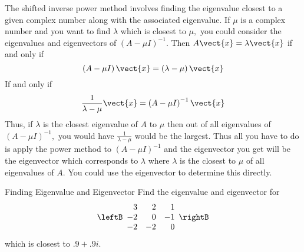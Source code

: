 The shifted inverse power method involves finding the eigenvalue closest to
a given complex number along with the associated eigenvalue. If $\mu $ is a
complex number and you want to find $\lambda $ which is closest to $\mu ,$
you could consider the eigenvalues and eigenvectors of $\left( A-\mu
I\right) ^{-1}$. Then $A\vect{x}=\lambda \vect{x}$ if and only if 
\begin{equation*}
\left( A-\mu I\right) \vect{x}=\left( \lambda -\mu \right) \vect{x}
\end{equation*}
If and only if 
\begin{equation*}
\frac{1}{\lambda -\mu }\vect{x}=\left( A-\mu I\right) ^{-1}\vect{x}
\end{equation*}
Thus, if $\lambda $ is the closest eigenvalue of $A$ to $\mu $ then out of
all eigenvalues of $\left( A-\mu I\right) ^{-1},$ you would have $\frac{1}{
\lambda -\mu }$ would be the largest. Thus all you have to do is apply the
power method to $\left( A-\mu I\right) ^{-1}$ and the eigenvector you get
will be the eigenvector which corresponds to $\lambda $ where $\lambda $ is
the closest to $\mu $ of all eigenvalues of $A$. You could use the
eigenvector to determine this directly.

\begin{example}{Finding Eigenvalue and Eigenvector}{}
Find the eigenvalue and eigenvector for 
\begin{equation*}
\leftB 
\begin{array}{rrr}
3 & 2 & 1 \\ 
-2 & 0 & -1 \\ 
-2 & -2 & 0
\end{array}
\rightB
\end{equation*}
which is closest to $.9+.9i$.
\end{example}

